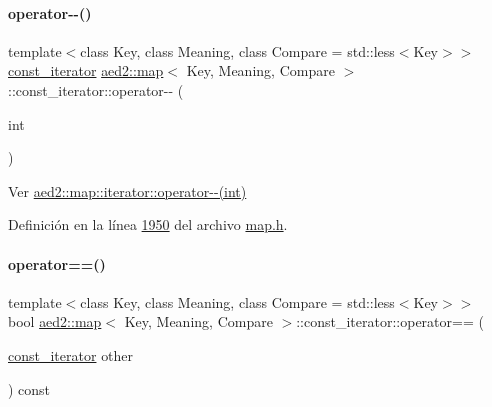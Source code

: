 \paragraph{\texorpdfstring{operator-\/-\/()}{operator--()}\hspace{0.1cm}{\footnotesize\ttfamily [2/2]}}
{\footnotesize\ttfamily template$<$class Key, class Meaning, class Compare = std\+::less$<$\+Key$>$$>$ \\
\hyperlink{classaed2_1_1map_1_1const__iterator}{const\+\_\+iterator} \hyperlink{classaed2_1_1map}{aed2\+::map}$<$ Key, Meaning, Compare $>$\+::const\+\_\+iterator\+::operator-\/-\/ (\begin{DoxyParamCaption}\item[{int}]{ }\end{DoxyParamCaption})\hspace{0.3cm}{\ttfamily [inline]}}



Ver \hyperlink{classaed2_1_1map_1_1iterator_add45e9ddbb8eeda99326cdb9ac9dd225_add45e9ddbb8eeda99326cdb9ac9dd225}{aed2\+::map\+::iterator\+::operator-\/-\/(int)} 



Definición en la línea \hyperlink{map_8h_source_l01950}{1950} del archivo \hyperlink{map_8h_source}{map.\+h}.

\mbox{\label{classaed2_1_1map_1_1const__iterator_a2ad68c35012e0c6b67d67c04d96585be_a2ad68c35012e0c6b67d67c04d96585be}} 
\paragraph{\texorpdfstring{operator==()}{operator==()}}
{\footnotesize\ttfamily template$<$class Key, class Meaning, class Compare = std\+::less$<$\+Key$>$$>$ \\
bool \hyperlink{classaed2_1_1map}{aed2\+::map}$<$ Key, Meaning, Compare $>$\+::const\+\_\+iterator\+::operator== (\begin{DoxyParamCaption}\item[{\hyperlink{classaed2_1_1map_1_1const__iterator}{const\+\_\+iterator}}]{other }\end{DoxyParamCaption}) const\hspace{0.3cm}{\ttfamily [inline]}}



